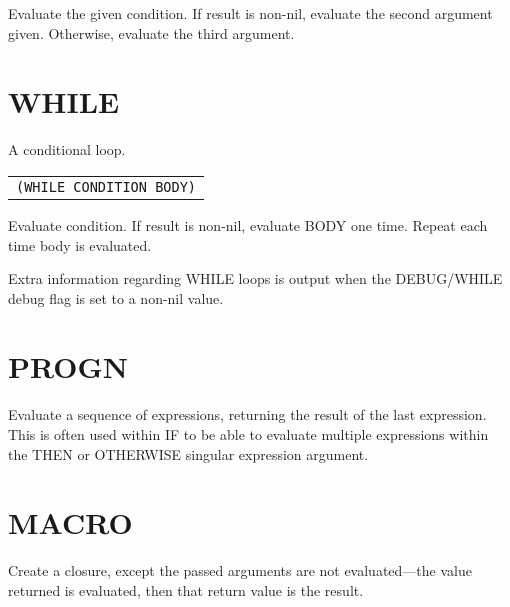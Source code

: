 \documentclass[
letterpaper,
oneside,
]{memoir}
\begin{document}
\noindent
Evaluate the given condition. If result is non-nil, evaluate the second argument given. Otherwise, evaluate the third argument.

\vspace{1em}

\section{WHILE}

\noindent
A conditional loop.

\begin{center}
  \begin{tabular}{c}
    \texttt{(WHILE CONDITION BODY)}
  \end{tabular}
\end{center}

\noindent
Evaluate condition. If result is non-nil, evaluate BODY one time. Repeat each time body is evaluated.

\vspace{1em}
\noindent
Extra information regarding WHILE loops is output when the DEBUG/WHILE debug flag is set to a non-nil value.

\vspace{1em}

\section{PROGN}

\noindent
Evaluate a sequence of expressions, returning the result of the last expression. This is often used within IF to be able to evaluate multiple expressions within the THEN or OTHERWISE singular expression argument.

\vspace{1em}

\section{MACRO}

\noindent
Create a closure, except the passed arguments are not evaluated---the value returned is evaluated, then that return value is the result.
\end{document}

